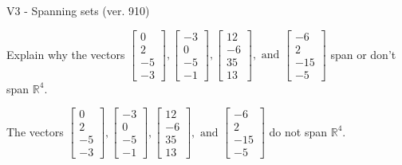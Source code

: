 \begin{exercise}
  \begin{exerciseTitle}V3 - Spanning sets (ver. 910)\end{exerciseTitle}
  \begin{exerciseStatement}
    Explain why the vectors \(\left[\begin{array}{r}
0 \\
2 \\
-5 \\
-3
\end{array}\right] , \left[\begin{array}{r}
-3 \\
0 \\
-5 \\
-1
\end{array}\right] , \left[\begin{array}{r}
12 \\
-6 \\
35 \\
13
\end{array}\right] , \text{ and } \left[\begin{array}{r}
-6 \\
2 \\
-15 \\
-5
\end{array}\right]\) span or don't span \(\mathbb{R}^4\). 
	


  \end{exerciseStatement}
  \begin{exerciseAnswer}
   The vectors \(\left[\begin{array}{r}
0 \\
2 \\
-5 \\
-3
\end{array}\right] , \left[\begin{array}{r}
-3 \\
0 \\
-5 \\
-1
\end{array}\right] , \left[\begin{array}{r}
12 \\
-6 \\
35 \\
13
\end{array}\right] , \text{ and } \left[\begin{array}{r}
-6 \\
2 \\
-15 \\
-5
\end{array}\right]\) 
  	 do not  
	span \(\mathbb{R}^4\).
  


  \end{exerciseAnswer}
\end{exercise}
